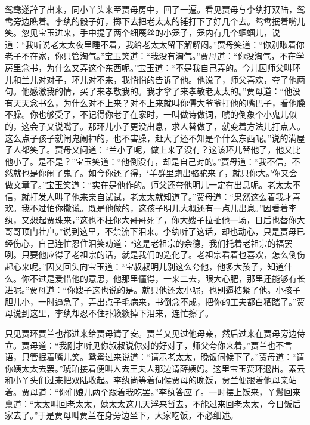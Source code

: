 \begin{parag}
    鸳鸯遂辞了出来，同小丫头来至贾母房中，回了一遍。看见贾母与李纨打双陆，鸳鸯旁边瞧着。李纨的骰子好，掷下去把老太太的锤打下了好几个去。鸳鸯抿着嘴儿笑。忽见宝玉进来，手中提了两个细蔑丝的小笼子，笼内有几个蝈蝈儿，说道：“我听说老太太夜里睡不着，我给老太太留下解解闷。”贾母笑道：“你别瞅着你老子不在家，你只管淘气。”宝玉笑道：“我没有淘气。”贾母道：“你没淘气，不在学房里念书，为什么又弄这个东西呢。”宝玉道：“不是我自己弄的。今儿因师父叫环儿和兰儿对对子，环儿对不来，我悄悄的告诉了他。他说了，师父喜欢，夸了他两句。他感激我的情，买了来孝敬我的。我才拿了来孝敬老太太的。”贾母道：“他没有天天念书么，为什么对不上来？对不上来就叫你儒大爷爷打他的嘴巴子，看他臊不臊。你也够受了，不记得你老子在家时，一叫做诗做词，唬的倒象个小鬼儿似的，这会子又说嘴了。那环儿小子更没出息，求人替做了，就变着方法儿打点人。这么点子孩子就闹鬼闹神的，也不害臊，赶大了还不知是个什么东西呢。”说的满屋子人都笑了。贾母又问道：“兰小子呢，做上来了没有？这该环儿替他了，他又比他小了。是不是？”宝玉笑道：“他倒没有，却是自己对的。”贾母道：“我不信，不然就也是你闹了鬼了。如今你还了得，‘羊群里跑出骆驼来了，就只你大。’你又会做文章了。”宝玉笑道：“实在是他作的。师父还夸他明儿一定有出息呢。老太太不信，就打发人叫了他来亲自试试，老太太就知道了。”贾母道：“果然这么着我才喜欢。我不过怕你撒谎。既是他做的，这孩子明儿大概还有一点儿出息。”因看着李纨，又想起贾珠来，”这也不枉你大哥哥死了，你大嫂子拉扯他一场，日后也替你大哥哥顶门壮户。”说到这里，不禁流下泪来。李纨听了这话，却也动心，只是贾母已经伤心，自己连忙忍住泪笑劝道：“这是老祖宗的余德，我们托着老祖宗的福罢咧。只要他应得了老祖宗的话，就是我们的造化了。老祖宗看着也喜欢，怎么倒伤起心来呢。”因又回头向宝玉道：“宝叔叔明儿别这么夸他，他多大孩子，知道什么。你不过是爱惜他的意思，他那里懂得，一来二去，眼大心肥，那里还能够有长进呢。”贾母道：“你嫂子这也说的是。就只他还太小呢，也别逼梏紧了他。小孩子胆儿小，一时逼急了，弄出点子毛病来，书倒念不成，把你的工夫都白糟踏了。”贾母说到这里，李纨却忍不住扑簌簌掉下泪来，连忙擦了。
\end{parag}


\begin{parag}
    只见贾环贾兰也都进来给贾母请了安。贾兰又见过他母亲，然后过来在贾母旁边侍立。贾母道：“我刚才听见你叔叔说你对的好对子，师父夸你来着。”贾兰也不言语，只管抿着嘴儿笑。鸳鸯过来说道：“请示老太太，晚饭伺候下了。”贾母道：“请你姨太太去罢。”琥珀接着便叫人去王夫人那边请薛姨妈。这里宝玉贾环退出。素云和小丫头们过来把双陆收起。李纨尚等着伺候贾母的晚饭，贾兰便跟着他母亲站着。贾母道：“你们娘儿两个跟着我吃罢。”李纨答应了。一时摆上饭来，丫鬟回来禀道：“太太叫回老太太，姨太太这几天浮来暂去，不能过来回老太太，今日饭后家去了。”于是贾母叫贾兰在身旁边坐下，大家吃饭，不必细述。
\end{parag}


